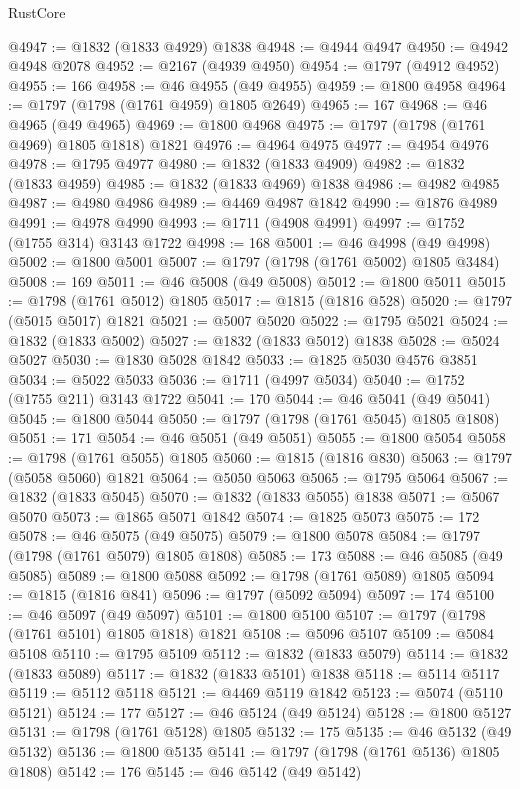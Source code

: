 \begin{lexlean}{RustCore}
\begin{coremodule}
@4947 := @1832 (@1833 @4929) @1838
@4948 := @4944 @4947
@4950 := @4942 @4948 @2078
@4952 := @2167 (@4939 @4950)
@4954 := @1797 (@4912 @4952)
@4955 := 166
@4958 := @46 @4955 (@49 @4955)
@4959 := @1800 @4958
@4964 := @1797 (@1798 (@1761 @4959) @1805 @2649)
@4965 := 167
@4968 := @46 @4965 (@49 @4965)
@4969 := @1800 @4968
@4975 := @1797 (@1798 (@1761 @4969) @1805 @1818) @1821
@4976 := @4964 @4975
@4977 := @4954 @4976
@4978 := @1795 @4977
@4980 := @1832 (@1833 @4909)
@4982 := @1832 (@1833 @4959)
@4985 := @1832 (@1833 @4969) @1838
@4986 := @4982 @4985
@4987 := @4980 @4986
@4989 := @4469 @4987 @1842
@4990 := @1876 @4989
@4991 := @4978 @4990
@4993 := @1711 (@4908 @4991)
@4997 := @1752 (@1755 @314) @3143 @1722
@4998 := 168
@5001 := @46 @4998 (@49 @4998)
@5002 := @1800 @5001
@5007 := @1797 (@1798 (@1761 @5002) @1805 @3484)
@5008 := 169
@5011 := @46 @5008 (@49 @5008)
@5012 := @1800 @5011
@5015 := @1798 (@1761 @5012) @1805
@5017 := @1815 (@1816 @528)
@5020 := @1797 (@5015 @5017) @1821
@5021 := @5007 @5020
@5022 := @1795 @5021
@5024 := @1832 (@1833 @5002)
@5027 := @1832 (@1833 @5012) @1838
@5028 := @5024 @5027
@5030 := @1830 @5028 @1842
@5033 := @1825 @5030 @4576 @3851
@5034 := @5022 @5033
@5036 := @1711 (@4997 @5034)
@5040 := @1752 (@1755 @211) @3143 @1722
@5041 := 170
@5044 := @46 @5041 (@49 @5041)
@5045 := @1800 @5044
@5050 := @1797 (@1798 (@1761 @5045) @1805 @1808)
@5051 := 171
@5054 := @46 @5051 (@49 @5051)
@5055 := @1800 @5054
@5058 := @1798 (@1761 @5055) @1805
@5060 := @1815 (@1816 @830)
@5063 := @1797 (@5058 @5060) @1821
@5064 := @5050 @5063
@5065 := @1795 @5064
@5067 := @1832 (@1833 @5045)
@5070 := @1832 (@1833 @5055) @1838
@5071 := @5067 @5070
@5073 := @1865 @5071 @1842
@5074 := @1825 @5073
@5075 := 172
@5078 := @46 @5075 (@49 @5075)
@5079 := @1800 @5078
@5084 := @1797 (@1798 (@1761 @5079) @1805 @1808)
@5085 := 173
@5088 := @46 @5085 (@49 @5085)
@5089 := @1800 @5088
@5092 := @1798 (@1761 @5089) @1805
@5094 := @1815 (@1816 @841)
@5096 := @1797 (@5092 @5094)
@5097 := 174
@5100 := @46 @5097 (@49 @5097)
@5101 := @1800 @5100
@5107 := @1797 (@1798 (@1761 @5101) @1805 @1818) @1821
@5108 := @5096 @5107
@5109 := @5084 @5108
@5110 := @1795 @5109
@5112 := @1832 (@1833 @5079)
@5114 := @1832 (@1833 @5089)
@5117 := @1832 (@1833 @5101) @1838
@5118 := @5114 @5117
@5119 := @5112 @5118
@5121 := @4469 @5119 @1842
@5123 := @5074 (@5110 @5121)
@5124 := 177
@5127 := @46 @5124 (@49 @5124)
@5128 := @1800 @5127
@5131 := @1798 (@1761 @5128) @1805
@5132 := 175
@5135 := @46 @5132 (@49 @5132)
@5136 := @1800 @5135
@5141 := @1797 (@1798 (@1761 @5136) @1805 @1808)
@5142 := 176
@5145 := @46 @5142 (@49 @5142)

\end{coremodule}
\end{lexlean}
